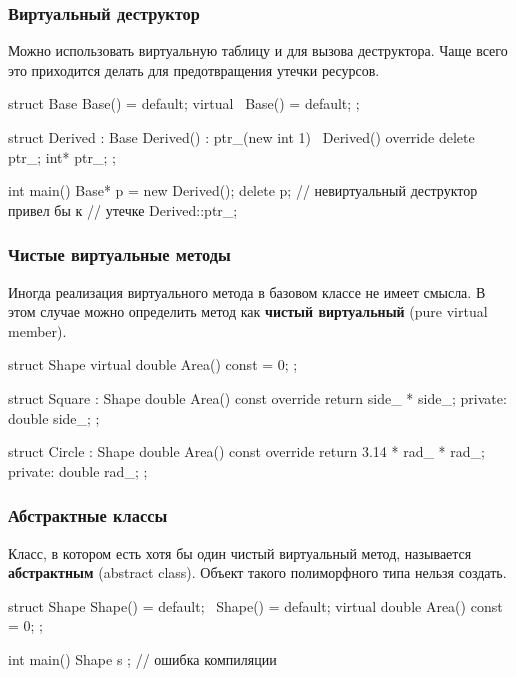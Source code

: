 \documentclass[compress, 8pt]{beamer}
\begin{document}
\begin{frame}[fragile]

    \frametitle{Виртуальный деструктор}

    \hfill\break
    Можно использовать виртуальную таблицу и для вызова деструктора.
    Чаще всего это приходится делать для предотвращения утечки ресурсов\footnotemark{}.


    \begin{myinplacelisting}[minted language=cpp]
struct Base {
    Base() = default;
    virtual ~Base() = default;
};

struct Derived : Base {
    Derived() : ptr_(new int {1}) {}
    ~Derived() override { delete ptr_; }
    int* ptr_;
};

int main() {
    Base* p = new Derived();
    delete p; // невиртуальный деструктор привел бы к
              // утечке Derived::ptr_;
}
    \end{myinplacelisting}

\end{frame}

\begin{frame}[fragile]

    \frametitle{Чистые виртуальные методы}

    \hfill\break
    Иногда реализация виртуального метода в базовом классе не имеет смысла.
    В этом случае можно определить метод как \textbf{чистый виртуальный}\footnotemark{}
    (pure virtual member).


    \begin{myinplacelisting}[minted language=cpp]
struct Shape {
    virtual double Area() const = 0;
};

struct Square : Shape {
    double Area() const override
        { return side_ * side_; }
private:
    double side_;
};

struct Circle : Shape {
    double Area() const override
        { return 3.14 * rad_ * rad_; }
private:
    double rad_;
};
    \end{myinplacelisting}

\end{frame}

\begin{frame}[fragile]

    \frametitle{Абстрактные классы}

    Класс, в котором есть хотя бы один чистый виртуальный метод, называется
    \textbf{абстрактным} (abstract class).
    Объект такого полиморфного типа нельзя создать.

    \begin{myinplacelisting}[minted language=cpp]
struct Shape {
    Shape() = default;
    ~Shape() = default;
    virtual double Area() const = 0;
};

int main() {
    Shape s {}; // ошибка компиляции
}
    \end{myinplacelisting}

\end{frame}
\end{document}
